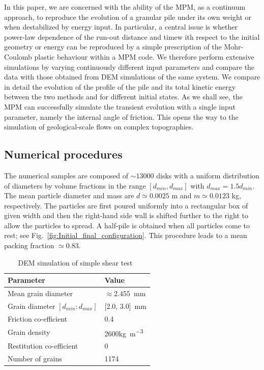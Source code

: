 In this paper, we are concerned with the ability of the MPM, as a continuum 
approach, to reproduce the evolution of a granular pile 
under its own weight or when destabilized by energy input. In particular, 
a central issue is whether power-law dependence of the run-out distance 
and timew ith respect to the initial geometry or energy can be reproduced 
by a simple prescription of the Mohr-Coulomb plastic behaviour within a  
MPM code. We therefore perform extensive simulations by varying continuously 
different input parameters and compare the data with those obtained from 
DEM simulations of the same system. We compare in detail the evolution of 
the profile of the pile and its total kinetic energy between the two methods 
and for different initial states. As we shall see, the MPM can successfully 
simulate the transient evolution with a single input parameter, namely the 
internal angle of friction. This opens the way to the simulation of 
geological-scale flows on complex topographies.  
  

\subsection{Numerical procedures}
\label{sec:num}

The numerical samples are composed of $\sim13000$ disks with a uniform 
distribution of diameters by volume fractions in the range $[d_{min}, 
d_{max}]$ with $d_{max} = 1.5 d_{min}$. The mean particle diameter and 
mass are $d\simeq 0.0025 $ m and $m\simeq 0.0123$ kg, respectively. 
The particles are first poured uniformly into a rectangular box of given width 
and then the right-hand side wall is shifted further to the right to allow the 
particles to spread. A half-pile is obtained when all particles come to 
rest; see Fig.~\ref{fig:Initial_final_configuration}. This procedure leads to a 
mean packing fraction $\simeq 0.83$.



\begin{table}[tbhp]
\caption{DEM simulation of simple shear test~\citep{Mutabaruka2013}}
\label{table:CD_Shear}
\centering
\begin{tabular}{ll}
\toprule
\textbf{Parameter} & \textbf{Value} \\ \midrule
Mean grain diameter & $\approx 2.455$~\si{\mm} \\
Grain diameter $[d_{min}:d_{max}]$ & [2.0, 3.0]~\si{\mm} \\
Friction co-efficient & 0.4\\
Grain density & 2600\si{\kg\per\meter\cubed} \\
Restitution co-efficient  & $0$\\
Number of grains & 1174 \\
\bottomrule
\end{tabular}
\end{table}


